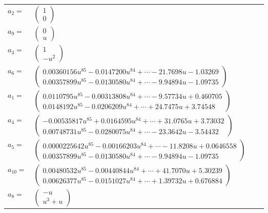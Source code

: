 \documentclass[1p]{elsarticle_modified}
\theoremstyle{definition}
\begin{document}
\begin{tabular}{m{7pt} m{180pt} m{7pt} m{180pt} }
\flushright $a_{2}=$&$\begin{pmatrix}1\\0\end{pmatrix}$ \\
\flushright $a_{9}=$&$\begin{pmatrix}0\\u\end{pmatrix}$ \\
\flushright $a_{3}=$&$\begin{pmatrix}1\\- u^2\end{pmatrix}$ \\
\flushright $a_{6}=$&$\begin{pmatrix}0.00360156 u^{85}-0.0147200 u^{84}+\cdots-21.7698 u-1.03269\\0.00357899 u^{85}-0.0130580 u^{84}+\cdots-9.94894 u-1.09735\end{pmatrix}$ \\
\flushright $a_{1}=$&$\begin{pmatrix}0.0110795 u^{85}-0.00313808 u^{84}+\cdots-9.57734 u+0.460705\\0.0148192 u^{85}-0.0206209 u^{84}+\cdots+24.7475 u+3.74548\end{pmatrix}$ \\
\flushright $a_{4}=$&$\begin{pmatrix}-0.00535817 u^{85}+0.0164595 u^{84}+\cdots+31.0765 u+3.73032\\0.00748731 u^{85}-0.0280075 u^{84}+\cdots-23.3642 u-3.54432\end{pmatrix}$ \\
\flushright $a_{5}=$&$\begin{pmatrix}0.0000225642 u^{85}-0.00166203 u^{84}+\cdots-11.8208 u+0.0646558\\0.00357899 u^{85}-0.0130580 u^{84}+\cdots-9.94894 u-1.09735\end{pmatrix}$ \\
\flushright $a_{10}=$&$\begin{pmatrix}0.00480532 u^{85}-0.00440844 u^{84}+\cdots+41.7070 u+5.30239\\0.00626377 u^{85}-0.0151027 u^{84}+\cdots+1.39732 u+0.676884\end{pmatrix}$ \\
\flushright $a_{8}=$&$\begin{pmatrix}- u\\u^3+u\end{pmatrix}$ \\

\end{tabular}
\end{document}
